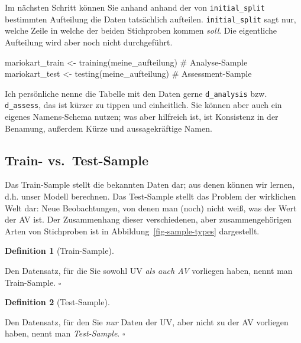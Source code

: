 \documentclass[
  letterpaper,
  twoside,
  open=any]{scrbook}
\newenvironment{Shaded}{\begin{snugshade}}{\end{snugshade}}
\newcommand{\CommentTok}[1]{\textcolor[rgb]{0.37,0.37,0.37}{#1}}
\newcommand{\FunctionTok}[1]{\textcolor[rgb]{0.28,0.35,0.67}{#1}}
\newcommand{\NormalTok}[1]{\textcolor[rgb]{0.00,0.23,0.31}{#1}}
\newcommand{\OtherTok}[1]{\textcolor[rgb]{0.00,0.23,0.31}{#1}}
\theoremstyle{definition}
\theoremstyle{definition}
\theoremstyle{definition}
\newtheorem{definition}{Definition}[chapter]
\theoremstyle{remark}
\begin{document}
Im nächsten Schritt können Sie anhand anhand der von
\texttt{initial\_split} bestimmten Aufteilung die Daten tatsächlich
aufteilen. \texttt{initial\_split} sagt nur, welche Zeile in welche der
beiden Stichproben kommen \emph{soll}. Die eigentliche Aufteilung wird
aber noch nicht durchgeführt.

\begin{Shaded}
\begin{Highlighting}[]
\NormalTok{mariokart\_train }\OtherTok{\textless{}{-}} 
  \FunctionTok{training}\NormalTok{(meine\_aufteilung)  }\CommentTok{\# Analyse{-}Sample}
\NormalTok{mariokart\_test }\OtherTok{\textless{}{-}} 
  \FunctionTok{testing}\NormalTok{(meine\_aufteilung)  }\CommentTok{\# Assessment{-}Sample}
\end{Highlighting}
\end{Shaded}

Ich persönliche nenne die Tabelle mit den Daten gerne
\texttt{d\_analysis} bzw. \texttt{d\_assess}, das ist kürzer zu tippen
und einheitlich. Sie können aber auch ein eigenes Namens-Schema nutzen;
was aber hilfreich ist, ist Konsistenz in der Benamung, außerdem Kürze
und aussagekräftige Namen.

\subsection{Train- vs.~Test-Sample}\label{train--vs.-test-sample}

Das Train-Sample stellt die bekannten Daten dar; aus denen können wir
lernen, d.h. unser Modell berechnen. Das Test-Sample stellt das Problem
der wirklichen Welt dar: Neue Beobachtungen, von denen man (noch) nicht
weiß, was der Wert der AV ist. Der Zusammenhang dieser verschiedenen,
aber zusammengehörigen Arten von Stichproben ist in
Abbildung~\ref{fig-sample-types} dargestellt.

\begin{definition}[Train-Sample]\protect\hypertarget{def-trainsample}{}\label{def-trainsample}

Den Datensatz, für die Sie sowohl UV \emph{als auch AV} vorliegen haben,
nennt man Train-Sample. \(\square\)

\end{definition}

\begin{definition}[Test-Sample]\protect\hypertarget{def-testsample}{}\label{def-testsample}

Den Datensatz, für den Sie \emph{nur} Daten der UV, aber nicht zu der AV
vorliegen haben, nennt man \emph{Test-Sample}. \(\square\)

\end{definition}
\end{document}
